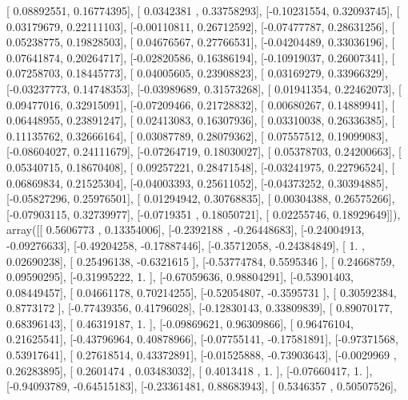\documentclass{article}
\begin{document}
       [ 0.08892551,  0.16774395],
       [ 0.0342381 ,  0.33758293],
       [-0.10231554,  0.32093745],
       [ 0.03179679,  0.22111103],
       [-0.00110811,  0.26712592],
       [-0.07477787,  0.28631256],
       [ 0.05238775,  0.19828503],
       [ 0.04676567,  0.27766531],
       [-0.04204489,  0.33036196],
       [ 0.07641874,  0.20264717],
       [-0.02820586,  0.16386194],
       [-0.10919037,  0.26007341],
       [ 0.07258703,  0.18445773],
       [ 0.04005605,  0.23908823],
       [ 0.03169279,  0.33966329],
       [-0.03237773,  0.14748353],
       [-0.03989689,  0.31573268],
       [ 0.01941354,  0.22462073],
       [ 0.09477016,  0.32915091],
       [-0.07209466,  0.21728832],
       [ 0.00680267,  0.14889941],
       [ 0.06448955,  0.23891247],
       [ 0.02413083,  0.16307936],
       [ 0.03310038,  0.26336385],
       [ 0.11135762,  0.32666164],
       [ 0.03087789,  0.28079362],
       [ 0.07557512,  0.19099083],
       [-0.08604027,  0.24111679],
       [-0.07264719,  0.18030027],
       [ 0.05378703,  0.24200663],
       [ 0.05340715,  0.18670408],
       [ 0.09257221,  0.28471548],
       [-0.03241975,  0.22796524],
       [ 0.06869834,  0.21525304],
       [-0.04003393,  0.25611052],
       [-0.04373252,  0.30394885],
       [-0.05827296,  0.25976501],
       [ 0.01294942,  0.30768835],
       [ 0.00304388,  0.26575266],
       [-0.07903115,  0.32739977],
       [-0.0719351 ,  0.18050721],
       [ 0.02255746,  0.18929649]]), array([[ 0.5606773 ,  0.13354006],
       [-0.2392188 , -0.26448683],
       [-0.24004913, -0.09276633],
       [-0.49204258, -0.17887446],
       [-0.35712058, -0.24384849],
       [ 1.        ,  0.02690238],
       [ 0.25496138, -0.6321615 ],
       [-0.53774784,  0.5595346 ],
       [ 0.24668759,  0.09590295],
       [-0.31995222,  1.        ],
       [-0.67059636,  0.98804291],
       [-0.53901403,  0.08449457],
       [ 0.04661178,  0.70214255],
       [-0.52054807, -0.3595731 ],
       [ 0.30592384,  0.8773172 ],
       [-0.77439356,  0.41796028],
       [-0.12830143,  0.33809839],
       [ 0.89070177,  0.68396143],
       [ 0.46319187,  1.        ],
       [-0.09869621,  0.96309866],
       [ 0.96476104,  0.21625541],
       [-0.43796964,  0.40878966],
       [-0.07755141, -0.17581891],
       [-0.97371568,  0.53917641],
       [ 0.27618514,  0.43372891],
       [-0.01525888, -0.73903643],
       [-0.0029969 ,  0.26283895],
       [ 0.2601474 ,  0.03483032],
       [ 0.4013418 ,  1.        ],
       [-0.07660417,  1.        ],
       [-0.94093789, -0.64515183],
       [-0.23361481,  0.88683943],
       [ 0.5346357 ,  0.50507526],
\end{document}
